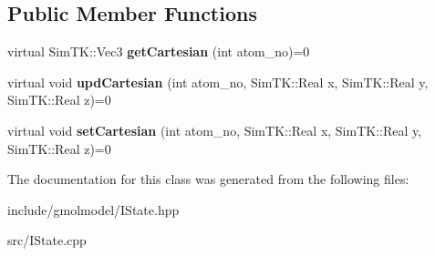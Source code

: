 \subsection*{Public Member Functions}
\begin{DoxyCompactItemize}
\item 
virtual Sim\+T\+K\+::\+Vec3 {\bfseries get\+Cartesian} (int atom\+\_\+no)=0\hypertarget{classIState_ade2b2fe5193cede74f6c51830b6e92a6}{}\label{classIState_ade2b2fe5193cede74f6c51830b6e92a6}

\item 
virtual void {\bfseries upd\+Cartesian} (int atom\+\_\+no, Sim\+T\+K\+::\+Real x, Sim\+T\+K\+::\+Real y, Sim\+T\+K\+::\+Real z)=0\hypertarget{classIState_a71f8b4e24dae414fff178f3fa9dfbe69}{}\label{classIState_a71f8b4e24dae414fff178f3fa9dfbe69}

\item 
virtual void {\bfseries set\+Cartesian} (int atom\+\_\+no, Sim\+T\+K\+::\+Real x, Sim\+T\+K\+::\+Real y, Sim\+T\+K\+::\+Real z)=0\hypertarget{classIState_af1cba5a5867876864564e1abec9bfeb8}{}\label{classIState_af1cba5a5867876864564e1abec9bfeb8}

\end{DoxyCompactItemize}


The documentation for this class was generated from the following files\+:\begin{DoxyCompactItemize}
\item 
include/gmolmodel/I\+State.\+hpp\item 
src/I\+State.\+cpp\end{DoxyCompactItemize}
